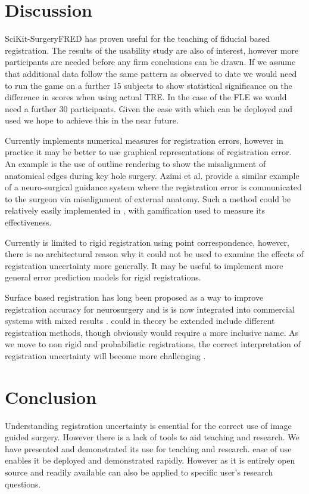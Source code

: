 \section{Discussion}
SciKit-SurgeryFRED has proven useful for the teaching of fiducial based registration.
The results of the usability study 
are also of interest, however more participants are needed before any firm conclusions
can be drawn.
If we assume that additional data follow the same pattern as observed to date we
would need to run the game on a further 15 subjects to show statistical significance
on the difference in scores when using actual \gls{TRE}. In the case of the
\gls{FLE} we would need a further 30 participants. Given the ease with
which \fred can be deployed and used we hope to achieve this in the near future.

Currently \fred implements numerical measures for registration errors, however
in practice it may be better to use
graphical representations of registration error. An example is the use of
outline rendering to show the misalignment of anatomical edges during key hole 
surgery\cite{PMID:29663273}. Azimi et al. \cite{10.1007/978-3-030-59716-0_7} 
provide a similar example of a neuro-surgical guidance system where the 
registration error is communicated to the surgeon via misalignment of 
external anatomy. Such a method could be relatively easily implemented in \fred, with
gamification used to measure its effectiveness. 

Currently \fred is limited to rigid registration using point correspondence, however, 
there is no architectural reason why it could not be used to examine the 
effects of registration uncertainty more generally. It may be useful to implement 
more general error prediction models for rigid registrations\cite{4359072,5629373}.

Surface based registration has long been proposed as a way to improve 
registration accuracy for neurosurgery \cite{736031} and is 
is now integrated into commercial systems with mixed results \cite{mongen2020}.
\fred could in 
theory be extended include different registration methods, though obviously would 
require a more inclusive name. As we move to non rigid and 
probabilistic registrations, the correct interpretation of registration 
uncertainty will become more challenging \cite{10.1007/978-3-030-59716-0_26}.

\section{Conclusion}
Understanding registration uncertainty is essential for the correct 
use of image guided surgery. However there is a lack of tools to 
aid teaching and research.
We have presented \fred and demonstrated its use for teaching and research. 
 ease of use enables it be deployed and demonstrated rapidly. However as
it is entirely open source and readily available \fred can also be applied to 
specific user's research questions. 




